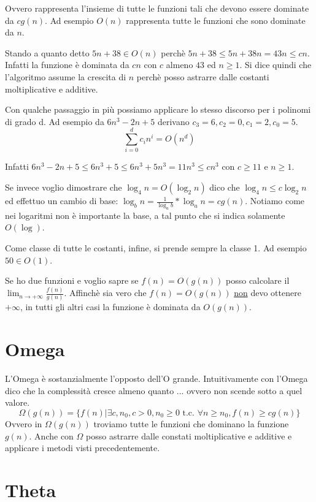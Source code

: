 Ovvero rappresenta l'insieme di tutte le funzioni tali che devono essere dominate da $cg(n)$.
Ad esempio $O(n)$ rappresenta tutte le funzioni che sono dominate da $n$.

Stando a quanto detto $5n+38\in O(n)$ perchè $5n+38\leq5n+38n=43n\leq cn$. Infatti la funzione è dominata da $cn$ con $c$ almeno $43$ ed $n\geq1$. Si dice quindi che l'algoritmo assume la crescita di $n$ perchè posso astrarre dalle costanti moltiplicative e additive.

Con qualche passaggio in più possiamo applicare lo stesso discorso per i polinomi di grado d.
Ad esempio da $6n^3-2n+5$ derivano $c_3=6, c_2=0, c_1=2, c_0=5$.
\begin{equation*}
    \sum^d_{i=0}c_in^i=O(n^d)
\end{equation*}

Infatti $6n^3-2n+5\leq6n^3+5\leq6n^3+5n^3=11n^3\leq cn^3$ con $c\geq11$ e $n\geq1$.

Se invece voglio dimostrare che $\log_4n=O(\log_2n)$ dico che $\log_4n\leq c\log_2n$ ed effettuo un cambio di base:
$\log_bn=\frac{1}{\log_ab}*\log_an=cg(n)$. Notiamo come nei logaritmi non è importante la base, a tal punto che si indica solamente $O(\log)$.

Come classe di tutte le costanti, infine, si prende sempre la classe 1. Ad esempio $50\in O(1)$.

Se ho due funzioni e voglio sapre se $f(n)=O(g(n))$ posso calcolare il $\lim_{n\to+\infty}\frac{f(n)}{g(n)}$. Affinchè sia vero che $f(n)=O(g(n))$ \underline{non} devo ottenere $+\infty$, in tutti gli altri casi la funzione è dominata da $O(g(n))$.

\section{Omega}
L'Omega è sostanzialmente l'opposto dell'O grande. Intuitivamente con l'Omega dico che la complessità cresce almeno quanto ... ovvero non scende sotto a quel valore.
\begin{equation*}
     \Omega(g(n))=\{f(n)|\exists c,n_0, c>0, n_0\geq0 \text{ t.c. } \forall n\geq n_0, f(n)\geq cg(n)\}
\end{equation*}
Ovvero in $\Omega(g(n))$ troviamo tutte le funzioni che dominano la funzione $g(n)$.
Anche con $\Omega$ posso astrarre dalle constati moltiplicative e additive e applicare i metodi visti precedentemente.

\section{Theta}

